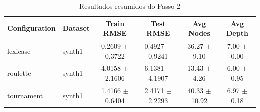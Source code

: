 \begin{table}[htbp]
  \centering
  \caption{Resultados resumidos do Passo 2}
  \label{tab:step2}
  \begin{tabular}{llcccc}
    \toprule
    Configuration & Dataset & Train RMSE & Test RMSE & Avg Nodes & Avg Depth \\
    \midrule
    lexicase & synth1 & 0.2609 $\pm$ 0.3722 & 0.4927 $\pm$ 0.9241 & 36.27 $\pm$ 9.10 & 7.00 $\pm$ 0.00 \\
    roulette & synth1 & 4.0158 $\pm$ 2.1606 & 6.1381 $\pm$ 4.1907 & 13.43 $\pm$ 4.26 & 6.00 $\pm$ 0.95 \\
    tournament & synth1 & 1.4166 $\pm$ 0.6404 & 2.4171 $\pm$ 2.2293 & 40.33 $\pm$ 10.92 & 6.97 $\pm$ 0.18 \\
    \bottomrule
  \end{tabular}
\end{table}
